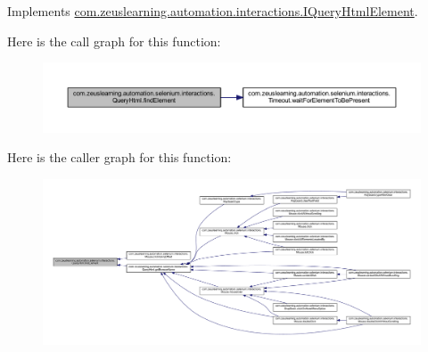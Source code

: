 Implements \hyperlink{interfacecom_1_1zeuslearning_1_1automation_1_1interactions_1_1IQueryHtmlElement_a78f486627e6d51d93e2cada41fdf8c0d}{com.\+zeuslearning.\+automation.\+interactions.\+I\+Query\+Html\+Element}.

Here is the call graph for this function\+:\nopagebreak
\begin{figure}[H]
\begin{center}
\leavevmode
\includegraphics[width=350pt]{dc/d41/classcom_1_1zeuslearning_1_1automation_1_1selenium_1_1interactions_1_1QueryHtml_a21ff6c1d862318a3e5beff87a1336a75_cgraph}
\end{center}
\end{figure}
Here is the caller graph for this function\+:
\nopagebreak
\begin{figure}[H]
\begin{center}
\leavevmode
\includegraphics[width=350pt]{dc/d41/classcom_1_1zeuslearning_1_1automation_1_1selenium_1_1interactions_1_1QueryHtml_a21ff6c1d862318a3e5beff87a1336a75_icgraph}
\end{center}
\end{figure}
\hypertarget{classcom_1_1zeuslearning_1_1automation_1_1selenium_1_1interactions_1_1QueryHtml_a3161a36666e8a81d86855c82b39e20ce}{}\label{classcom_1_1zeuslearning_1_1automation_1_1selenium_1_1interactions_1_1QueryHtml_a3161a36666e8a81d86855c82b39e20ce} 
